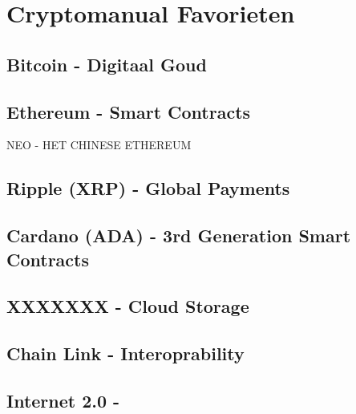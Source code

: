 \chapter{Cryptomanual Favorieten}

\section{Bitcoin - Digitaal Goud}

\section{Ethereum - Smart Contracts}

\begin{tipbox}{NEO - HET CHINESE ETHEREUM}

\end{tipbox}

\section{Ripple (XRP) - Global Payments}

\section{Cardano (ADA) - 3rd Generation Smart Contracts}

\section{XXXXXXX - Cloud Storage}

\section{Chain Link - Interoprability}

\section{Internet 2.0 - }

